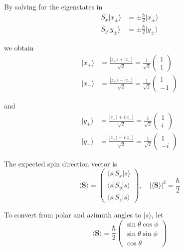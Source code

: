 By solving for the eigenstates in
\begin{align*}
S_x|x_\pm\rangle&=\pm\tfrac{\hbar}{2}|x_\pm\rangle
\\
S_y|y_\pm\rangle&=\pm\tfrac{\hbar}{2}|y_\pm\rangle
\end{align*}

we obtain
\begin{align*}
|x_+\rangle&=\frac{|z_+\rangle+|z_-\rangle}{\sqrt2}=\frac{1}{\sqrt2}\begin{pmatrix}1\\1\end{pmatrix}
\\
|x_-\rangle&=\frac{|z_+\rangle-|z_-\rangle}{\sqrt2}=\frac{1}{\sqrt2}\begin{pmatrix}1\\-1\end{pmatrix}
\end{align*}

and
\begin{align*}
|y_+\rangle&=\frac{|z_+\rangle+i|z_-\rangle}{\sqrt2}=\frac{1}{\sqrt2}\begin{pmatrix}1\\i\end{pmatrix}
\\
|y_-\rangle&=\frac{|z_+\rangle-i|z_-\rangle}{\sqrt2}=\frac{1}{\sqrt2}\begin{pmatrix}1\\-i\end{pmatrix}
\end{align*}

The expected spin direction vector is
\begin{equation*}
\langle\mathbf S\rangle=\begin{pmatrix}
\langle s|S_x|s\rangle\\
\langle s|S_y|s\rangle\\
\langle s|S_z|s\rangle
\end{pmatrix},\quad
|\langle\mathbf S\rangle|^2=\frac{\hbar}{2}
\end{equation*}

To convert from polar and azimuth angles to $|s\rangle$, let
\begin{equation*}
\langle\mathbf S\rangle=\frac{\hbar}{2}\begin{pmatrix}
\sin\theta\cos\phi\\
\sin\theta\sin\phi\\
\cos\theta
\end{pmatrix}
\end{equation*}


